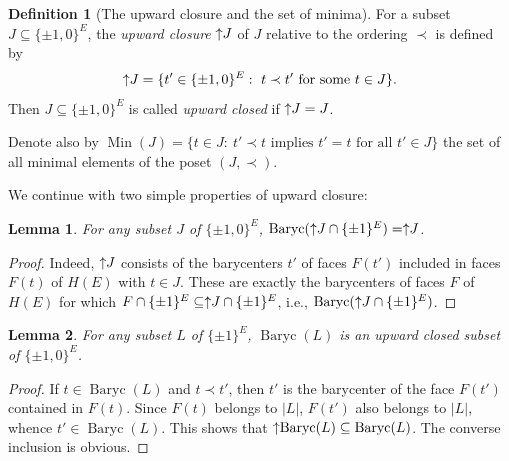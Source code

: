 \documentclass[11pt,a4paper]{amsart}
\newtheorem{lemma}{Lemma}
\theoremstyle{definition}
\newtheorem{definition}{Definition}
\numberwithin{equation}{section}
\DeclareMathOperator{\Baryc}{Baryc}
\DeclareMathOperator{\Min}{Min}
\newcommand{\covectors}{\ensuremath{L}}
\newcommand{\HH}{\ensuremath{H}}
\newcommand{\hcovectors}{J}
\begin{document}
\begin{definition} [The upward closure and the set of minima] \label{def:upper-closure} For a subset $\hcovectors\subseteq \{ \pm 1,0\}^E$,  the {\it upward  closure} $\uparrow\hspace*{-0.1cm}\hcovectors$ of $\hcovectors$ relative to the ordering $\prec$ is defined by
$$\uparrow\hspace*{-0.1cm}\hcovectors=\{ t'\in \{ \pm 1,0\}^E: ~t\prec t' \mbox{ for some } t\in \hcovectors\}.$$
Then $\hcovectors\subseteq \{ \pm 1,0\}^E$ is called \emph{upward closed} if $\uparrow\hspace*{-0.1cm}\hcovectors=\hcovectors$.

Denote also by $\Min(\hcovectors)=\{ t\in \hcovectors: ~t'\prec t \mbox{ implies } t'=t \mbox{ for all } t'\in \hcovectors\}$ the set of all minimal elements of the poset $(\hcovectors, \prec)$.
\end{definition}

We continue with two simple properties of upward closure:

\begin{lemma} \label{upper-set-baryc} For any subset $\hcovectors$ of $\{ \pm 1,0\}^E$, $\Baryc(\uparrow\hspace*{-0.1cm}\hcovectors\cap \{ \pm 1\}^E)=\uparrow\hspace*{-0.1cm}\hcovectors$.
\end{lemma}

\begin{proof} Indeed, $\uparrow\hspace*{-0.1cm}\hcovectors$ consists of the barycenters $t'$ of faces $F(t')$ included in faces $F(t)$ of $\HH(E)$ with $t\in \hcovectors$. These are exactly the barycenters of faces $F$ of $\HH(E)$ for which $F\cap\{ \pm 1\}^E\subseteq \uparrow\hspace*{-0.1cm}\hcovectors\cap \{ \pm 1\}^E$, i.e.,
$\Baryc(\uparrow\hspace*{-0.1cm}\hcovectors\cap \{ \pm 1\}^E)$.
\end{proof}


\begin{lemma} \label{upper-set-baryc} For any subset $\covectors$ of $\{ \pm 1\}^E$, $\Baryc(\covectors)$ is an upward closed subset of $\{ \pm 1,0\}^E$.
\end{lemma}


\begin{proof} If $t\in \Baryc(\covectors)$ and $t\prec t'$, then $t'$ is the barycenter of the face $F(t')$ contained in $F(t)$. Since $F(t)$ belongs to $|L|$, $F(t')$ also belongs to $|L|$, whence $t'\in \Baryc(L)$. This shows that
$\uparrow\hspace*{-0.1cm}\Baryc(\covectors)\subseteq \Baryc(\covectors)$. The converse inclusion is obvious.
\end{proof}
\end{document}
